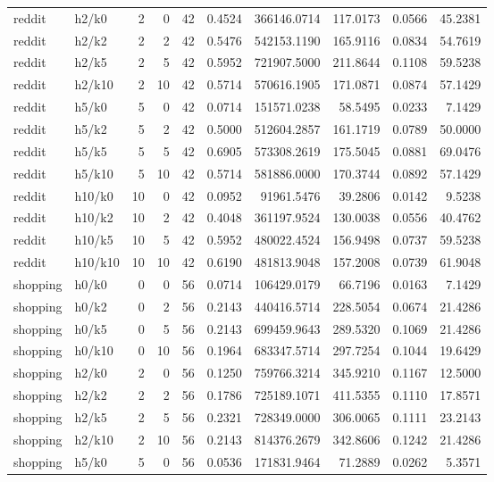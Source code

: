 \begin{tabular}{llrrrrrrrr}
reddit & h2/k0 & 2 & 0 & 42 & 0.4524 & 366146.0714 & 117.0173 & 0.0566 & 45.2381 \\
reddit & h2/k2 & 2 & 2 & 42 & 0.5476 & 542153.1190 & 165.9116 & 0.0834 & 54.7619 \\
reddit & h2/k5 & 2 & 5 & 42 & 0.5952 & 721907.5000 & 211.8644 & 0.1108 & 59.5238 \\
reddit & h2/k10 & 2 & 10 & 42 & 0.5714 & 570616.1905 & 171.0871 & 0.0874 & 57.1429 \\
reddit & h5/k0 & 5 & 0 & 42 & 0.0714 & 151571.0238 & 58.5495 & 0.0233 & 7.1429 \\
reddit & h5/k2 & 5 & 2 & 42 & 0.5000 & 512604.2857 & 161.1719 & 0.0789 & 50.0000 \\
reddit & h5/k5 & 5 & 5 & 42 & 0.6905 & 573308.2619 & 175.5045 & 0.0881 & 69.0476 \\
reddit & h5/k10 & 5 & 10 & 42 & 0.5714 & 581886.0000 & 170.3744 & 0.0892 & 57.1429 \\
reddit & h10/k0 & 10 & 0 & 42 & 0.0952 & 91961.5476 & 39.2806 & 0.0142 & 9.5238 \\
reddit & h10/k2 & 10 & 2 & 42 & 0.4048 & 361197.9524 & 130.0038 & 0.0556 & 40.4762 \\
reddit & h10/k5 & 10 & 5 & 42 & 0.5952 & 480022.4524 & 156.9498 & 0.0737 & 59.5238 \\
reddit & h10/k10 & 10 & 10 & 42 & 0.6190 & 481813.9048 & 157.2008 & 0.0739 & 61.9048 \\
shopping & h0/k0 & 0 & 0 & 56 & 0.0714 & 106429.0179 & 66.7196 & 0.0163 & 7.1429 \\
shopping & h0/k2 & 0 & 2 & 56 & 0.2143 & 440416.5714 & 228.5054 & 0.0674 & 21.4286 \\
shopping & h0/k5 & 0 & 5 & 56 & 0.2143 & 699459.9643 & 289.5320 & 0.1069 & 21.4286 \\
shopping & h0/k10 & 0 & 10 & 56 & 0.1964 & 683347.5714 & 297.7254 & 0.1044 & 19.6429 \\
shopping & h2/k0 & 2 & 0 & 56 & 0.1250 & 759766.3214 & 345.9210 & 0.1167 & 12.5000 \\
shopping & h2/k2 & 2 & 2 & 56 & 0.1786 & 725189.1071 & 411.5355 & 0.1110 & 17.8571 \\
shopping & h2/k5 & 2 & 5 & 56 & 0.2321 & 728349.0000 & 306.0065 & 0.1111 & 23.2143 \\
shopping & h2/k10 & 2 & 10 & 56 & 0.2143 & 814376.2679 & 342.8606 & 0.1242 & 21.4286 \\
shopping & h5/k0 & 5 & 0 & 56 & 0.0536 & 171831.9464 & 71.2889 & 0.0262 & 5.3571 \\

\end{tabular}
